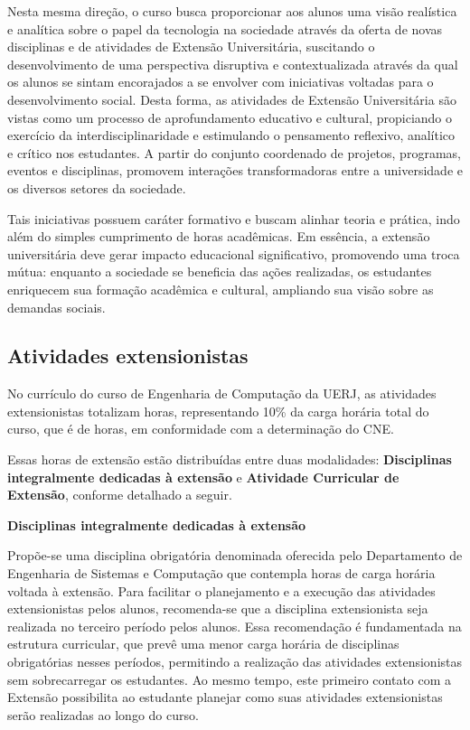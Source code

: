 Nesta mesma direção, o curso busca proporcionar aos alunos uma visão realística e analítica sobre o papel da tecnologia na sociedade através da oferta de novas disciplinas e de atividades de Extensão Universitária, suscitando o desenvolvimento de uma perspectiva disruptiva e contextualizada através da qual os alunos se sintam encorajados a se envolver com iniciativas voltadas para o desenvolvimento social. Desta forma, as atividades de Extensão Universitária são vistas como um processo de aprofundamento educativo e cultural, propiciando o exercício da interdisciplinaridade e estimulando o pensamento reflexivo, analítico e crítico nos estudantes. A partir do conjunto coordenado de projetos, programas, eventos e disciplinas, promovem interações transformadoras entre a universidade e os diversos setores da sociedade.

Tais iniciativas possuem caráter formativo e buscam alinhar teoria e prática, indo além do simples cumprimento de horas acadêmicas. Em essência, a extensão universitária deve gerar impacto educacional significativo, promovendo uma troca mútua: enquanto a sociedade se beneficia das ações realizadas, os estudantes enriquecem sua formação acadêmica e cultural, ampliando sua visão sobre as demandas sociais.

\subsection{Atividades extensionistas}

No currículo do curso de Engenharia de Computação da UERJ, as atividades extensionistas totalizam \horasExtensao horas, representando 10\% da carga horária total do curso, que é de \totalHorasCurso horas, em conformidade com a determinação do CNE.

Essas horas de extensão estão distribuídas entre duas modalidades: \textbf{Disciplinas integralmente dedicadas à extensão} e \textbf{Atividade Curricular de Extensão}, conforme detalhado a seguir.

\textbf{Disciplinas integralmente dedicadas à extensão}

Propõe-se uma disciplina obrigatória denominada \textbf{\Ext{ }} oferecida pelo Departamento de Engenharia de Sistemas e Computação que contempla \ExtCH{ } horas de carga horária voltada à extensão. Para facilitar o planejamento e a execução das atividades extensionistas pelos alunos, recomenda-se que a disciplina  extensionista seja realizada no terceiro período pelos alunos. Essa recomendação é fundamentada na estrutura curricular, que prevê uma menor carga horária de disciplinas obrigatórias nesses períodos, permitindo a realização das atividades extensionistas sem sobrecarregar os estudantes. Ao mesmo tempo, este primeiro contato com a Extensão possibilita ao estudante planejar como suas atividades extensionistas serão realizadas ao longo do curso.

